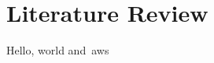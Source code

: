 
\thispagestyle{plain}
\newpage
\section{Literature Review}\label{sec:literature-review}

\normalsize
Hello, world and~\gls{aws} ~\citep{cc_overview}